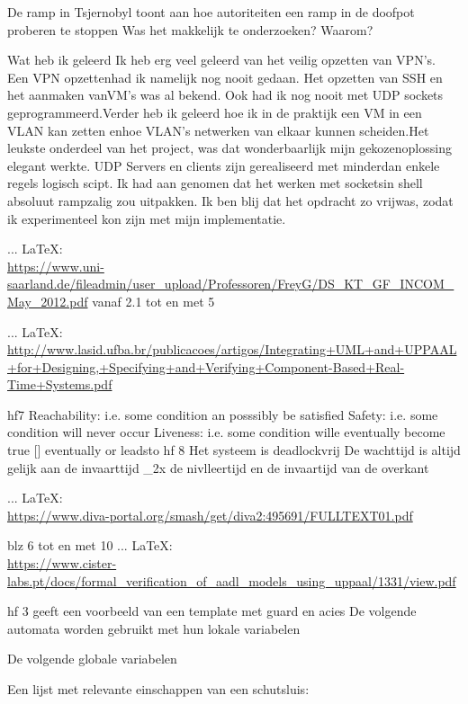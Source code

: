 \begin{thebibliography}{99}
{{{{{{De ramp in Tsjernobyl toont aan hoe autoriteiten een ramp in de doofpot proberen te stoppen
Was het makkelijk te onderzoeken? Waarom?



Wat heb ik geleerd
Ik heb erg veel geleerd van het veilig opzetten van VPN’s. Een VPN opzettenhad ik namelijk nog nooit gedaan. Het opzetten van SSH en het aanmaken vanVM’s was al bekend. Ook had ik nog nooit met UDP sockets geprogrammeerd.Verder heb ik geleerd hoe ik in de praktijk een VM in een VLAN kan zetten enhoe VLAN’s netwerken van elkaar kunnen scheiden.Het leukste onderdeel van het project, was dat wonderbaarlijk mijn gekozenoplossing elegant werkte. UDP Servers en clients zijn gerealiseerd met minderdan enkele regels logisch scipt. Ik had aan genomen dat het werken met socketsin shell absoluut rampzalig zou uitpakken. Ik ben blij dat het opdracht zo vrijwas, zodat ik experimenteel kon zijn met mijn implementatie.




 ... \LaTeX:\\ \url{https://www.uni-saarland.de/fileadmin/user_upload/Professoren/FreyG/DS_KT_GF_INCOM_May_2012.pdf}
vanaf 2.1 tot en met 5

 ... \LaTeX:\\ \url{http://www.lasid.ufba.br/publicacoes/artigos/Integrating+UML+and+UPPAAL+for+Designing,+Specifying+and+Verifying+Component-Based+Real-Time+Systems.pdf}

hf7
Reachability: i.e. some condition an posssibly be satisfied
Safety: i.e. some condition will never occur
Liveness: i.e. some condition wille eventually become true [] eventually or leadsto
hf 8
Het systeem is deadlockvrij
De wachttijd is altijd gelijk aan de invaarttijd _2x de nivlleertijd en de invaartijd van de overkant

 ... \LaTeX:\\ \url{https://www.diva-portal.org/smash/get/diva2:495691/FULLTEXT01.pdf}

blz 6 tot en met 10
 ... \LaTeX:\\ \url{https://www.cister-labs.pt/docs/formal_verification_of_aadl_models_using_uppaal/1331/view.pdf}

hf 3 geeft een voorbeeld van een template met guard en acies
De volgende automata worden gebruikt met hun lokale variabelen

De volgende globale variabelen

Een lijst met relevante einschappen van een schutsluis:

}}}}}}
\end{thebibliography}
